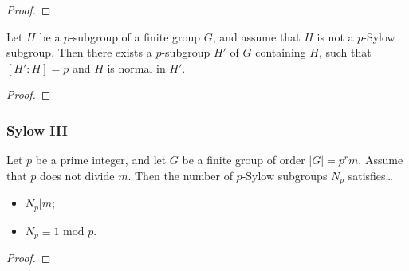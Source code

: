 \begin{proof}

\end{proof}

\begin{proposition}
Let $H$ be a $p$-subgroup of a finite group $G$, and assume that $H$ is not a $p$-Sylow subgroup. Then there exists a $p$-subgroup
$H'$ of $G$ containing $H$, such that $[H' : H] = p$ and $H$ is normal in $H'$.
\end{proposition}

\begin{proof}

\end{proof}

\subsubsection{Sylow III}\label{sylow3}

\begin{theorem}
\label{sylowthm3}
Let $p$ be a prime integer, and let $G$ be a finite group of order $|G| = p^rm$. Assume that $p$ does not divide $m$. Then the number of $p$-Sylow subgroups $N_p$ satisfies\dots
\begin{itemize}
  \item $N_p | m$;
  \item $N_p \equiv 1 \textrm{ mod } p$.
\end{itemize}
\end{theorem}

\begin{proof}

\end{proof}